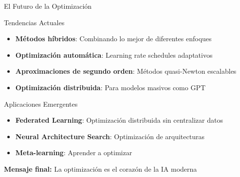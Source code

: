 \documentclass[10pt]{beamer}
\begin{document}
\begin{frame}{El Futuro de la Optimización}
\begin{block}{Tendencias Actuales}
\begin{itemize}
\item \textbf{Métodos híbridos}: Combinando lo mejor de diferentes enfoques
\item \textbf{Optimización automática}: Learning rate schedules adaptativos
\item \textbf{Aproximaciones de segundo orden}: Métodos quasi-Newton escalables
\item \textbf{Optimización distribuida}: Para modelos masivos como GPT
\end{itemize}
\end{block}

\begin{exampleblock}{Aplicaciones Emergentes}
\begin{itemize}
\item \textbf{Federated Learning}: Optimización distribuida sin centralizar datos
\item \textbf{Neural Architecture Search}: Optimización de arquitecturas
\item \textbf{Meta-learning}: Aprender a optimizar
\end{itemize}
\end{exampleblock}

\vspace{0.5cm}
\textcolor{azulUni}{\textbf{Mensaje final:}} La optimización es el corazón de la IA moderna
\end{frame}
\end{document}

